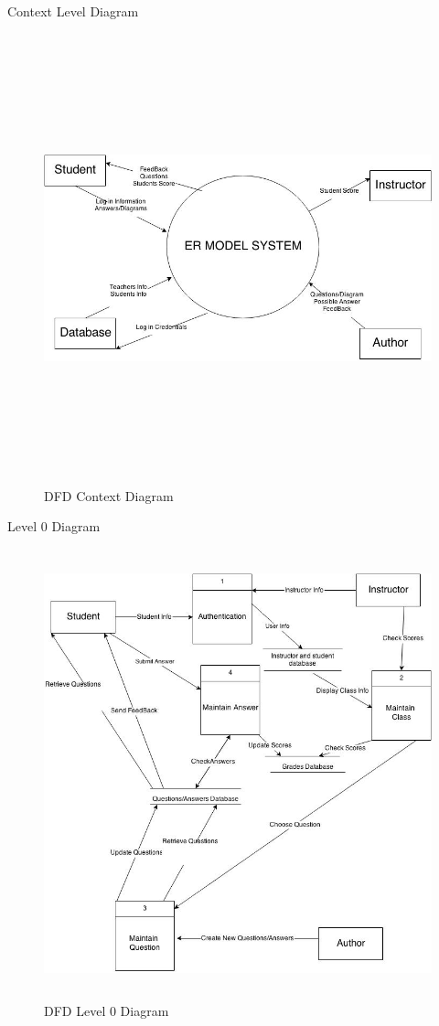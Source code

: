\begin{section}{Context Level Diagram}
    \begin{figure}[h!]
        \begin{center}
          \centerline{ \includegraphics[height=13cm]{ContextDiagram.jpg}}
            \caption{DFD Context Diagram}
        \end{center}
    \end{figure}
\end{section}
\newpage
\begin{section}{Level 0 Diagram}
    \begin{figure}[h!]
        \begin{center}
            \centerline{\includegraphics[height=13cm]{DFDLevel0.jpg}}
            \caption{DFD Level 0 Diagram}
        \end{center}
    \end{figure}
\end{section}
\newpage
